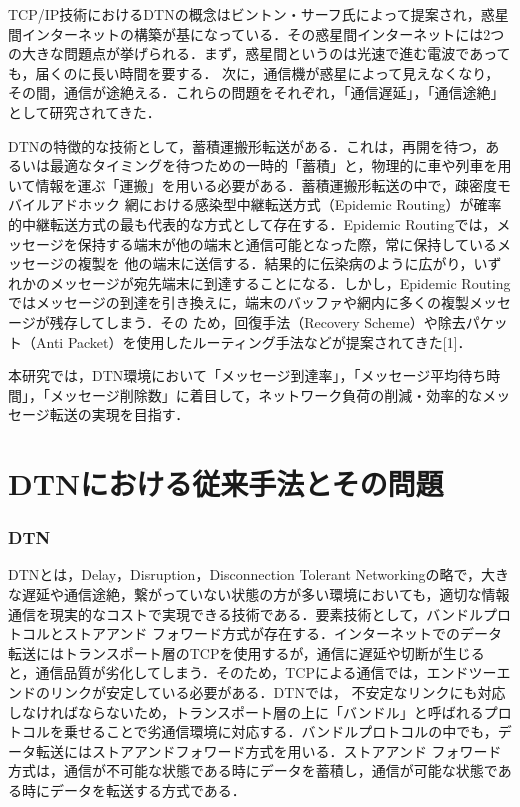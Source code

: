\documentclass[11pt]{icsthesis}
\begin{document}
TCP/IP技術におけるDTNの概念はビントン・サーフ氏によって提案され，惑星間インターネットの構築が基になっている．その惑星間インターネットには2つの大きな問題点が挙げられる．まず，惑星間というのは光速で進む電波であっても，届くのに長い時間を要する．
次に，通信機が惑星によって見えなくなり，その間，通信が途絶える．これらの問題をそれぞれ，「通信遅延」，「通信途絶」として研究されてきた．

DTNの特徴的な技術として，蓄積運搬形転送がある．これは，再開を待つ，あるいは最適なタイミングを待つための一時的「蓄積」と，物理的に車や列車を用いて情報を運ぶ「運搬」を用いる必要がある．蓄積運搬形転送の中で，疎密度モバイルアドホック
網における感染型中継転送方式（Epidemic Routing）が確率的中継転送方式の最も代表的な方式として存在する．Epidemic Routingでは，メッセージを保持する端末が他の端末と通信可能となった際，常に保持しているメッセージの複製を
他の端末に送信する．結果的に伝染病のように広がり，いずれかのメッセージが宛先端末に到達することになる．しかし，Epidemic Routingではメッセージの到達を引き換えに，端末のバッファや網内に多くの複製メッセージが残存してしまう．その
ため，回復手法（Recovery Scheme）や除去パケット（Anti Packet）を使用したルーティング手法などが提案されてきた[1]．

本研究では，DTN環境において「メッセージ到達率」，「メッセージ平均待ち時間」，「メッセージ削除数」に着目して，ネットワーク負荷の削減・効率的なメッセージ転送の実現を目指す．

\chapter{DTNにおける従来手法とその問題}

\subsection{DTN}
DTNとは，Delay，Disruption，Disconnection Tolerant Networkingの略で，大きな遅延や通信途絶，繋がっていない状態の方が多い環境においても，適切な情報通信を現実的なコストで実現できる技術である．要素技術として，バンドルプロトコルとストアアンド
フォワード方式が存在する．インターネットでのデータ転送にはトランスポート層のTCPを使用するが，通信に遅延や切断が生じると，通信品質が劣化してしまう．そのため，TCPによる通信では，エンドツーエンドのリンクが安定している必要がある．DTNでは，
不安定なリンクにも対応しなければならないため，トランスポート層の上に「バンドル」と呼ばれるプロトコルを乗せることで劣通信環境に対応する．バンドルプロトコルの中でも，データ転送にはストアアンドフォワード方式を用いる．ストアアンド
フォワード方式は，通信が不可能な状態である時にデータを蓄積し，通信が可能な状態である時にデータを転送する方式である．
\end{document}

